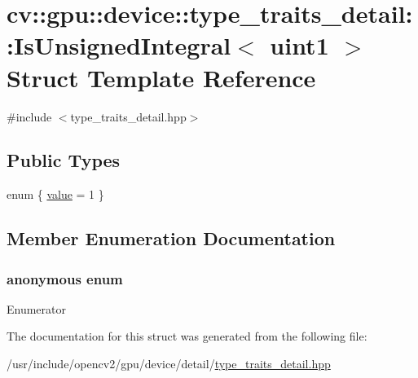 \hypertarget{structcv_1_1gpu_1_1device_1_1type__traits__detail_1_1IsUnsignedIntegral_3_01uint1_01_4}{\section{cv\-:\-:gpu\-:\-:device\-:\-:type\-\_\-traits\-\_\-detail\-:\-:Is\-Unsigned\-Integral$<$ uint1 $>$ Struct Template Reference}
\label{structcv_1_1gpu_1_1device_1_1type__traits__detail_1_1IsUnsignedIntegral_3_01uint1_01_4}
}


{\ttfamily \#include $<$type\-\_\-traits\-\_\-detail.\-hpp$>$}

\subsection*{Public Types}
\begin{DoxyCompactItemize}
\item 
enum \{ \hyperlink{structcv_1_1gpu_1_1device_1_1type__traits__detail_1_1IsUnsignedIntegral_3_01uint1_01_4_a7244bb7c768823e0558b4db68bd442d5a7b23e6c6e31e1058ea81af6bcf903af8}{value} = 1
 \}
\end{DoxyCompactItemize}


\subsection{Member Enumeration Documentation}
\hypertarget{structcv_1_1gpu_1_1device_1_1type__traits__detail_1_1IsUnsignedIntegral_3_01uint1_01_4_a7244bb7c768823e0558b4db68bd442d5}{\subsubsection[{anonymous enum}]{\setlength{\rightskip}{0pt plus 5cm}anonymous enum}}\label{structcv_1_1gpu_1_1device_1_1type__traits__detail_1_1IsUnsignedIntegral_3_01uint1_01_4_a7244bb7c768823e0558b4db68bd442d5}
\begin{Desc}
\item[Enumerator]\par
\begin{description}
\item[{\em 
\hypertarget{structcv_1_1gpu_1_1device_1_1type__traits__detail_1_1IsUnsignedIntegral_3_01uint1_01_4_a7244bb7c768823e0558b4db68bd442d5a7b23e6c6e31e1058ea81af6bcf903af8}{value}\label{structcv_1_1gpu_1_1device_1_1type__traits__detail_1_1IsUnsignedIntegral_3_01uint1_01_4_a7244bb7c768823e0558b4db68bd442d5a7b23e6c6e31e1058ea81af6bcf903af8}
}]\end{description}
\end{Desc}


The documentation for this struct was generated from the following file\-:\begin{DoxyCompactItemize}
\item 
/usr/include/opencv2/gpu/device/detail/\hyperlink{type__traits__detail_8hpp}{type\-\_\-traits\-\_\-detail.\-hpp}\end{DoxyCompactItemize}

